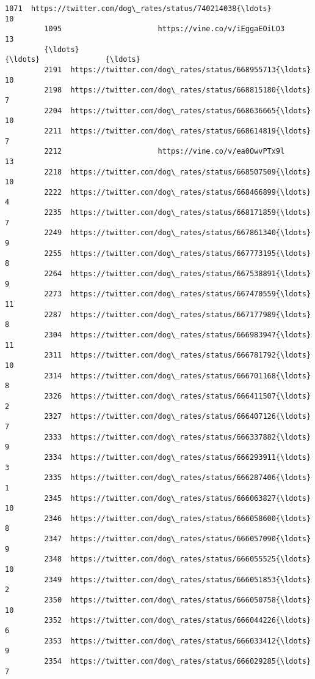 \documentclass[11pt]{article}
\begin{document}
\begin{Verbatim}[commandchars=\\\{\}]
         1071  https://twitter.com/dog\_rates/status/740214038{\ldots}                10   
         1095                      https://vine.co/v/iEggaEOiLO3                13   
         {\ldots}                                                 {\ldots}               {\ldots}   
         2191  https://twitter.com/dog\_rates/status/668955713{\ldots}                10   
         2198  https://twitter.com/dog\_rates/status/668815180{\ldots}                 7   
         2204  https://twitter.com/dog\_rates/status/668636665{\ldots}                10   
         2211  https://twitter.com/dog\_rates/status/668614819{\ldots}                 7   
         2212                      https://vine.co/v/ea0OwvPTx9l                13   
         2218  https://twitter.com/dog\_rates/status/668507509{\ldots}                10   
         2222  https://twitter.com/dog\_rates/status/668466899{\ldots}                 4   
         2235  https://twitter.com/dog\_rates/status/668171859{\ldots}                 7   
         2249  https://twitter.com/dog\_rates/status/667861340{\ldots}                 9   
         2255  https://twitter.com/dog\_rates/status/667773195{\ldots}                 8   
         2264  https://twitter.com/dog\_rates/status/667538891{\ldots}                 9   
         2273  https://twitter.com/dog\_rates/status/667470559{\ldots}                11   
         2287  https://twitter.com/dog\_rates/status/667177989{\ldots}                 8   
         2304  https://twitter.com/dog\_rates/status/666983947{\ldots}                11   
         2311  https://twitter.com/dog\_rates/status/666781792{\ldots}                10   
         2314  https://twitter.com/dog\_rates/status/666701168{\ldots}                 8   
         2326  https://twitter.com/dog\_rates/status/666411507{\ldots}                 2   
         2327  https://twitter.com/dog\_rates/status/666407126{\ldots}                 7   
         2333  https://twitter.com/dog\_rates/status/666337882{\ldots}                 9   
         2334  https://twitter.com/dog\_rates/status/666293911{\ldots}                 3   
         2335  https://twitter.com/dog\_rates/status/666287406{\ldots}                 1   
         2345  https://twitter.com/dog\_rates/status/666063827{\ldots}                10   
         2346  https://twitter.com/dog\_rates/status/666058600{\ldots}                 8   
         2347  https://twitter.com/dog\_rates/status/666057090{\ldots}                 9   
         2348  https://twitter.com/dog\_rates/status/666055525{\ldots}                10   
         2349  https://twitter.com/dog\_rates/status/666051853{\ldots}                 2   
         2350  https://twitter.com/dog\_rates/status/666050758{\ldots}                10   
         2352  https://twitter.com/dog\_rates/status/666044226{\ldots}                 6   
         2353  https://twitter.com/dog\_rates/status/666033412{\ldots}                 9   
         2354  https://twitter.com/dog\_rates/status/666029285{\ldots}                 7   
         

\end{Verbatim}
\end{document}

